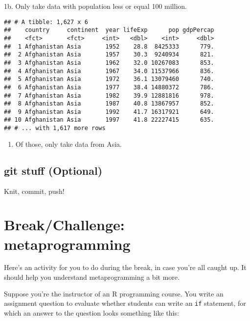 \documentclass[]{article}
\newenvironment{Shaded}{\begin{snugshade}}{\end{snugshade}}
\newcommand{\KeywordTok}[1]{\textcolor[rgb]{0.13,0.29,0.53}{\textbf{{#1}}}}
\newcommand{\DecValTok}[1]{\textcolor[rgb]{0.00,0.00,0.81}{{#1}}}
\newcommand{\StringTok}[1]{\textcolor[rgb]{0.31,0.60,0.02}{{#1}}}
\newcommand{\NormalTok}[1]{{#1}}
\providecommand{\tightlist}{%
  \setlength{\itemsep}{0pt}\setlength{\parskip}{0pt}}
\begin{document}
1b. Only take data with population less or equal 100 million.

\begin{Shaded}
\end{Shaded}

\begin{verbatim}
## # A tibble: 1,627 x 6
##    country     continent  year lifeExp      pop gdpPercap
##    <fct>       <fct>     <int>   <dbl>    <int>     <dbl>
##  1 Afghanistan Asia       1952    28.8  8425333      779.
##  2 Afghanistan Asia       1957    30.3  9240934      821.
##  3 Afghanistan Asia       1962    32.0 10267083      853.
##  4 Afghanistan Asia       1967    34.0 11537966      836.
##  5 Afghanistan Asia       1972    36.1 13079460      740.
##  6 Afghanistan Asia       1977    38.4 14880372      786.
##  7 Afghanistan Asia       1982    39.9 12881816      978.
##  8 Afghanistan Asia       1987    40.8 13867957      852.
##  9 Afghanistan Asia       1992    41.7 16317921      649.
## 10 Afghanistan Asia       1997    41.8 22227415      635.
## # ... with 1,617 more rows
\end{verbatim}

\begin{enumerate}
\def\labelenumi{\arabic{enumi}.}
\setcounter{enumi}{1}
\tightlist
\item
  Of those, only take data from Asia.
\end{enumerate}

\subsection{git stuff (Optional)}\label{git-stuff-optional}

Knit, commit, push!

\section{Break/Challenge:
metaprogramming}\label{breakchallenge-metaprogramming}

Here's an activity for you to do during the break, in case you're all
caught up. It should help you understand metaprogramming a bit more.

Suppose you're the instructor of an R programming course. You write an
assignment question to evaluate whether students can write an
\texttt{if} statement, for which an answer to the question looks
something like this:
\end{document}
